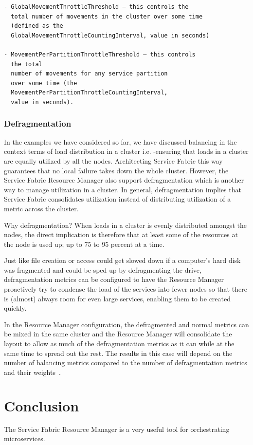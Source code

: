 \begin{verbatim}
- GlobalMovementThrottleThreshold – this controls the
  total number of movements in the cluster over some time
  (defined as the
  GlobalMovementThrottleCountingInterval, value in seconds)

- MovementPerPartitionThrottleThreshold – this controls
  the total
  number of movements for any service partition 
  over some time (the
  MovementPerPartitionThrottleCountingInterval, 
  value in seconds).
\end{verbatim}

\subsubsection{Defragmentation}
In the examples we have considered so far, we have discussed balancing
in the context terms of load distribution in a cluster i.e.  -ensuring
that loads in a cluster are equally utilized by all the
nodes. Architecting Service Fabric this way guarantees that no local
failure takes down the whole cluster.  However, the Service Fabric
Resource Manager also support defragmentation which is another way to
manage utilization in a cluster. In general, defragmentation implies
that Service Fabric consolidates utilization instead of distributing
utilization of a metric across the cluster.

Why defragmentation? When loads in a cluster is evenly distributed
amongst the nodes, the direct implication is therefore that at least
some of the resources at the node is used up; up to 75 to 95 percent
at a time.

Just like file creation or access could get slowed down if a
computer’s hard disk was fragmented and could be sped up by
defragmenting the drive, defragmentation metrics can be configured to
have the Resource Manager proactively try to condense the load of the
services into fewer nodes so that there is (almost) always room for
even large services, enabling them to be created quickly.

In the Resource Manager configuration, the defragmented and normal
metrics can be mixed in the same cluster and the Resource Manager will
consolidate the layout to allow as much of the
defragmentation metrics as it can while at the same time to spread out the
rest. The results in this case will depend on the number of balancing
metrics compared to the number of defragmentation metrics and their
weights~\cite{hid-sp18-501-description}.


\section{Conclusion}
The Service Fabric Resource Manager is a very useful tool for orchestrating 
microservices.

